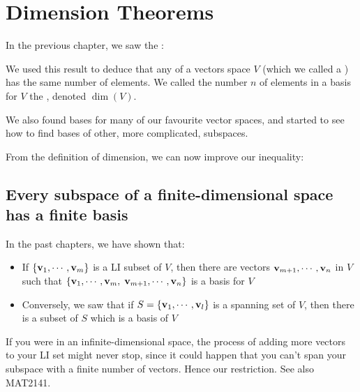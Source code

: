 \chapter{Dimension Theorems}
\label{Chapter:10dimensionThm}

In the previous chapter, we saw the :


We used this result to deduce that 
any  of a vectors space $V$ (which we called a )
has the same number of elements.  
  We called the number $n$ of elements in
a basis for $V$ the , denoted $\dim(V)$.



We also found bases for many of our favourite vector spaces, and 
started to see how to find bases of other, more complicated, subspaces.

From the definition of dimension, we can now improve our inequality:


\section{Every subspace of a finite-dimensional space has a finite basis}

In the past chapters, we have shown that:
\begin{itemize}
\item If $\{\mathbf{v}_1, \cdots, \mathbf{v}_m\}$ is a LI subset of $V$, then there are
vectors $\mathbf{v}_{m+1}, \cdots, \mathbf{v}_n$ in $V$ such that $\{\mathbf{v}_1, \cdots, \mathbf{v}_m,$ $ \mathbf{v}_{m+1}, \cdots, \mathbf{v}_n\}$ is a basis for $V$ 
\item Conversely, we saw that if $S = \{\mathbf{v}_1, \cdots, \mathbf{v}_l\}$ is a spanning set of $V$, then there
is a subset of $S$ which is a basis of $V$ 
\end{itemize}

\begin{remark}
If you were in an infinite-dimensional space, the process of adding more
vectors to your LI set might never stop, since it could happen that you
can't span your subspace with a finite number of vectors.  Hence our
restriction.  See also MAT2141.\end{remark}

